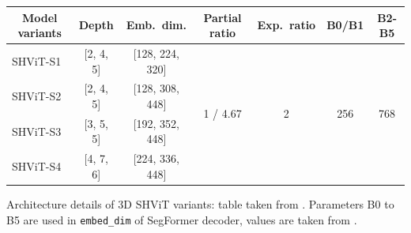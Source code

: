 \begin{center}
	\begin{threeparttable}[H]
	\begin{tabular}{l|cc|c|c|c|c}
		\toprule
		\multicolumn{1}{c|}{Model variants} & Depth     & Emb.~dim.       & Partial ratio              & Exp.~ratio         & B0/B1                & B2-B5                \\
		\midrule
		\midrule
		SHViT-S1                            & [2, 4, 5] & [128, 224, 320] &  \multirow{4}{*}{1 / 4.67} & \multirow{4}{*}{2} & \multirow{4}{*}{256} & \multirow{4}{*}{768} \\
		SHViT-S2                            & [2, 4, 5] & [128, 308, 448] &                            &                    &                      &                      \\
		SHViT-S3                            & [3, 5, 5] & [192, 352, 448] &                            &                    &                      &                      \\
		SHViT-S4                            & [4, 7, 6] & [224, 336, 448] &                            &                    &                      &                      \\ 
		\bottomrule
	\end{tabular}
	\caption[Architecture details of 3D SHViT variants]{Architecture details of 3D SHViT variants: table taken from \cite{yun2024shvit}. Parameters B0 to B5 are used in {\tt embed\_dim} of SegFormer decoder, values are taken from \cite{IMvision12}.}
	\label{tab:variants}	
	\end{threeparttable}
\end{center}



